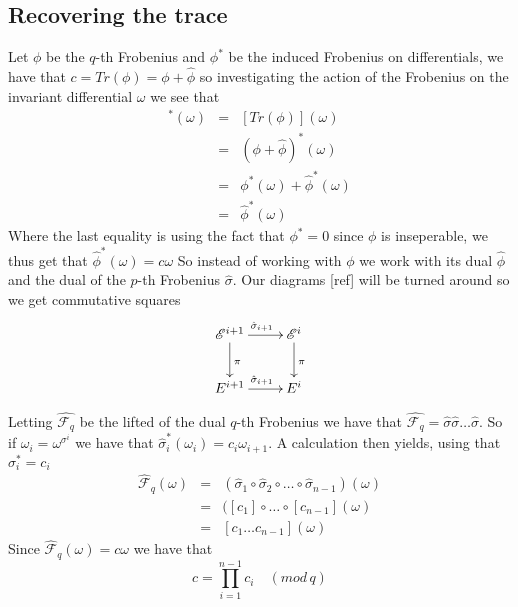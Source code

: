 \documentclass[a4paper,10pt]{amsart}
\begin{document}
\subsection{Recovering the trace}
Let $\phi$ be the $q$-th Frobenius and $\phi^*$ be the induced Frobenius on differentials, 
we have that $c = Tr(\phi) = \phi + \hat{\phi}$ so investigating the
action of the Frobenius on the invariant differential $\omega$ we see that
\begin{eqnarray}
 [Tr(\phi)]^*(\omega)&=& [Tr(\phi)](\omega) \nonumber \\
		     &=& (\phi + \hat{\phi})^*(\omega) \nonumber \\
		     &=& \phi^*(\omega) + \hat{\phi}^*(\omega) \nonumber \\
		     &=& \hat{\phi}^*(\omega) \nonumber
\end{eqnarray}
Where the last equality is using the fact that $\phi^* = 0$ since $\phi$ is inseperable, we thus
get that $\hat{\phi}^*(\omega) = c\omega$ 
So instead of working with $\phi$ we work with its dual $\hat{\phi}$ and the dual
of the $p$-th Frobenius $\hat{\sigma}$. Our diagrams [ref] will be turned around so we get commutative
squares
$$
\xymatrix {
  \mathscr{E}^{i+1} \ar[r]^{\hat{\sigma}_{i+1}} \ar[d]^\pi & \mathscr{E}^i \ar[d]^\pi \\
  E^{i+1} \ar[r]^{\hat{\sigma}_{i+1}} & E^i 
}
$$

Letting $\hat{\mathscr{F}_q}$ be the lifted of the dual $q$-th Frobenius we have that
$\hat{\mathscr{F}_q} = \hat{\sigma} \hat{\sigma} \ldots \hat{\sigma}$.
So if $\omega_i = \omega^{\sigma^i}$ we have that $\hat{\sigma}_i^*(\omega_i) = c_i \omega_{i+1}$.
A calculation then yields, using that $\sigma_i^* = c_i$
\begin{eqnarray}
  \hat{\mathscr{F}}_q(\omega) &=& (\hat{\sigma}_1 \circ \hat{\sigma}_2 \circ \ldots \circ \hat{\sigma}_{n-1})(\omega) \nonumber \\
			      &=& ([c_1] \circ \ldots \circ [c_{n-1}](\omega) \nonumber \\
			      &=& [c_1\ldots c_{n-1}](\omega) \nonumber
\end{eqnarray}
Since $\hat{\mathscr{F}}_q(\omega) = c \omega$ we have that
$$ c = \prod_{i=1}^{n-1} c_i \quad (mod\, q) $$
\end{document}
